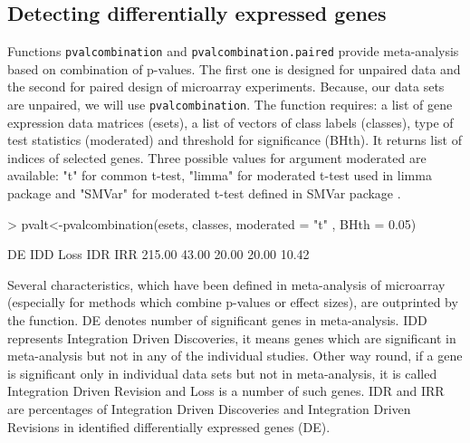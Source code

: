 \documentclass[a4paper]{report}
\begin{document}
\subsection*{Detecting differentially expressed genes}
Functions \verb!pvalcombination! and \verb!pvalcombination.paired! provide meta-analysis based on combination of p-values. The first one is designed for unpaired data and the second for paired design of microarray experiments. Because, our data sets are unpaired, we will use \verb!pvalcombination!. The function requires: a list of gene expression data matrices ({\ttfamily esets}), a list of vectors of class labels ({\ttfamily classes}), type of test statistics ({\ttfamily moderated}) and threshold for significance ({\ttfamily BHth}). It returns list of indices of selected genes. Three possible values for argument {\ttfamily moderated} are available: {\ttfamily "t"} for common t-test, {\ttfamily "limma"} for moderated t-test used in {\ttfamily limma} package \cite{limma} and {\ttfamily "SMVar"} for moderated t-test defined in SMVar package \cite{SMVar}. 
\begin{Schunk}
\begin{Sinput}
> pvalt<-pvalcombination(esets, classes, moderated = "t" , BHth = 0.05)
\end{Sinput}
\begin{Soutput}
    DE    IDD   Loss    IDR    IRR 
215.00  43.00  20.00  20.00  10.42 
\end{Soutput}
\end{Schunk}
Several characteristics, which have been defined in meta-analysis of microarray (especially for methods which combine p-values or effect sizes), are outprinted by the function. {\ttfamily DE} denotes number of significant genes in meta-analysis. {\ttfamily IDD} represents Integration Driven Discoveries, it means genes which are significant in meta-analysis but not in any of the individual studies. Other way round, if a gene is significant only in individual data sets but not in meta-analysis, it is called Integration Driven Revision and {\ttfamily Loss} is a number of such genes. {\ttfamily IDR} and {\ttfamily IRR} are percentages of Integration Driven Discoveries and Integration Driven Revisions in identified differentially expressed genes ({\ttfamily DE}).  
\end{document}
